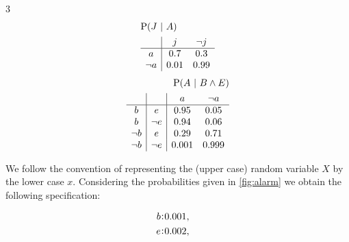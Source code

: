 \documentclass[adraft,copyright,creativecommons]{eptcs}
\newcommand{\at}[1]{\ensuremath{\!\del{#1}}}
\newcommand{\pr}[1]{\ensuremath{\mathrm{P}\at{#1}}}
\newcommand{\given}{\ensuremath{~\middle|~}}
\newcommand{\probfact}[2]{\ensuremath{#2\mkern-4mu:\mkern-4mu#1}}
\begin{document}
\begin{figure*}
\begin{multicols}{3}
        \footnotesize{
            \begin{equation*}
                \begin{split}
                    &\pr{J \given A}\\
                    &  \begin{array}{c|cc}
                               & j    & \neg j \\
                        \hline
                        a      & 0.7  & 0.3    \\
                        \neg a & 0.01 & 0.99
                    \end{array}
                \end{split}
            \end{equation*}
        }
        \footnotesize{
            \begin{equation*}
                \begin{split}
                    \pr{A \given B \wedge E}\\
                    \begin{array}{c|c|cc}
                               &        & a     & \neg a \\
                        \hline
                        b      & e      & 0.95  & 0.05   \\
                        b      & \neg e & 0.94  & 0.06   \\
                        \neg b & e      & 0.29  & 0.71   \\
                        \neg b & \neg e & 0.001 & 0.999
                    \end{array}
                \end{split}
            \end{equation*}
        }
    \end{multicols}
    \caption{The Earthquake, Burglary, Alarm model}
    \label{fig:alarm}
\end{figure*}

We follow the convention of representing the (upper case) random variable $X$ by the lower case $x$.
%
Considering the probabilities given in \cref{fig:alarm} we obtain the following spe\-ci\-fi\-ca\-tion:

\begin{equation*}
    \begin{aligned}
        \probfact{0.001}{b} & ,\cr
        \probfact{0.002}{e} & ,\cr
    \end{aligned}
    \label{eq:not.so.simple.example}
\end{equation*}
\end{document}
